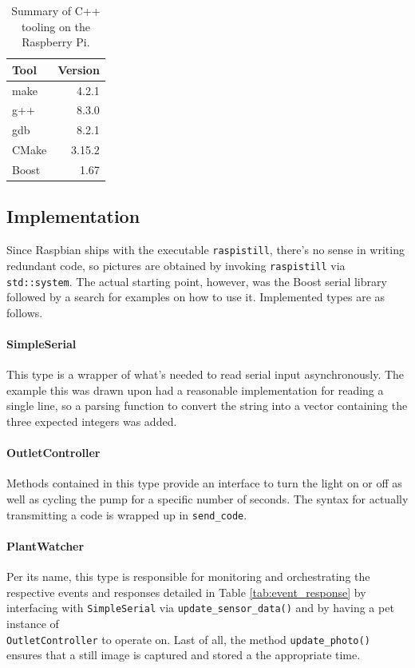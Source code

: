 \documentclass[]{article}
\begin{document}
\begin{table}[h]
	\centering
	\caption{Summary of C++ tooling on the Raspberry Pi.}
	\begin{tabular}{l|r}
		\textbf{Tool} & \textbf{Version} \\ \hline
		make & 4.2.1 \\ \hline
		g++ & 8.3.0 \\ \hline
		gdb & 8.2.1 \\ \hline		
		CMake & 3.15.2 \\ \hline
		Boost & 1.67
	\end{tabular}	
\end{table}

\subsection{Implementation}
Since Raspbian ships with the executable \verb|raspistill|, there's no sense in writing redundant code, so pictures are obtained by invoking \verb|raspistill| via \verb|std::system|.  The actual starting point, however, was the Boost serial library followed by a search for examples on how to use it.  Implemented types are as follows.

\paragraph{SimpleSerial}
This type is a wrapper of what's needed to read serial input asynchronously.  The example this was drawn upon had a reasonable implementation for reading a single line, so a parsing function to convert the string into a vector containing the three expected integers was added.

\paragraph{OutletController}
Methods contained in this type provide an interface to turn the light on or off as well as cycling the pump for a specific number of seconds.  The syntax for actually transmitting a code is wrapped up in \verb|send_code|.

\paragraph{PlantWatcher}
Per its name, this type is responsible for monitoring and orchestrating the respective events and responses detailed in Table \ref{tab:event_response} by interfacing with \verb|SimpleSerial| via \verb|update_sensor_data()| and by having a pet instance of 
\\
\verb|OutletController| to operate on.  Last of all, the method \verb|update_photo()| ensures that a still image is captured and stored a the appropriate time.
\end{document}
